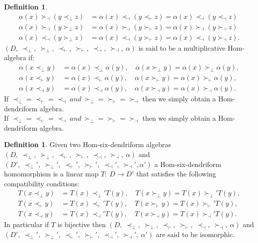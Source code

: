 \documentclass[11pt,twoside,reqno]{amsart}
\theoremstyle{plain}
\theoremstyle{definition}
\newtheorem{definition}[thm]{Definition}
\begin{document}
\begin{definition}
\begin{align}
\alpha(x) \succ_\dashv (y \prec_\perp z) &=\alpha(x) \prec_\dashv (y \prec_\vdash z) = \alpha(x) \prec_\dashv (y \prec_\dashv z) \label{sq15}\\
\alpha(x) \succ_\dashv (y \succ_\perp z) &= \alpha(x) \succ_\dashv (y \succ_\vdash z) = \alpha(x) \succ_\dashv (y \succ_\dashv z) \label{sq16}\\
\alpha(x) \prec_\dashv (y \succ_\perp z) &= \alpha(x) \prec_\dashv (y \succ_\vdash z) = \alpha(x) \prec_\dashv (y \succ_\dashv z).\label{sq17}
\end{align}
$(D,\  \prec_\perp,\  \succ_\perp  ,\ \prec_\vdash  ,\ \succ_\vdash,\  \prec_\dashv,\  \succ_\dashv,\  \alpha)$ is said to be a multiplicative Hom-algebra if:
\begin{align*}
 \alpha(x\prec_\perp y)&=\alpha(x)\prec_\perp\alpha(y) ,\quad \alpha(x\succ_\perp y)=\alpha(x)\succ_\perp\alpha(y),\\
 \alpha(x\prec_\vdash y)&=\alpha(x)\prec_\vdash\alpha(y),
 \quad
\alpha(x\succ_\vdash y)=\alpha(x)\succ_\vdash\alpha(y),\\
\alpha(x\prec_\dashv y)&=\alpha(x)\prec_\dashv\alpha(y) ,\quad \alpha(x\succ_\dashv y)=\alpha(x)\succ_\dashv\alpha(y).
\end{align*}
If
$\prec_\perp = \prec_\vdash = \prec_\dashv \ and \ \succ_\perp = \succ_\vdash = \succ_\dashv $
then we simply obtain a Hom-dendriform algebra.\\ If
$\prec_\perp = \prec_\vdash = \prec_\dashv \ and \ \succ_\perp = \succ_\vdash = \succ_\dashv $
then we simply obtain a Hom-dendriform algebra.
\end{definition}
\begin{definition}\label{d15}
Given two Hom-six-dendriform algebras $(D,\  \prec_\perp,\  \succ_\perp  ,\ \prec_\vdash  ,\ \succ_\vdash,\  \prec_\dashv,\  \succ_\dashv,\  \alpha)$ and $(D' ,\ \prec_\perp' ,\ \succ_\perp',\  \prec_\vdash',\  \succ_\vdash',\  \prec_\dashv',\  \succ_\dashv'  ,\alpha')$  a Hom-six-dendriform homomorphism is a linear map $T: \ D \to D'$ that satisfies the following compatibility conditions:
 \begin{align*}
 T(x\prec_\perp y)&=T(x)\prec_\perp'T(y) ,\quad T(x\succ_\perp y)=T(x)\succ_\perp'T(y),\\
 T(x\prec_\vdash y)&=T(x)\prec_\vdash'T(y) ,\quad
T(x\succ_\vdash y)=T(x)\succ_\vdash' T(y),\\  T(x\prec_\dashv y)&=T(x)\prec_\dashv'T(y),\quad T(x\succ_\dashv y)=T(x)\succ_\dashv'T(y).
\end{align*}
In particular  if $T$ is bijective  then $(D,\  \prec_\perp,\  \succ_\perp  ,\ \prec_\vdash  ,\ \succ_\vdash,\  \prec_\dashv,\  \succ_\dashv,\  \alpha)$ and\\ $(D',\  \prec_\perp' ,\ \succ_\perp',\  \prec_\vdash' ,\ \succ_\vdash' ,\ \prec_\dashv' ,\ \succ_\dashv',\  \alpha')$ are said to be isomorphic.
\end{definition}
\end{document}

